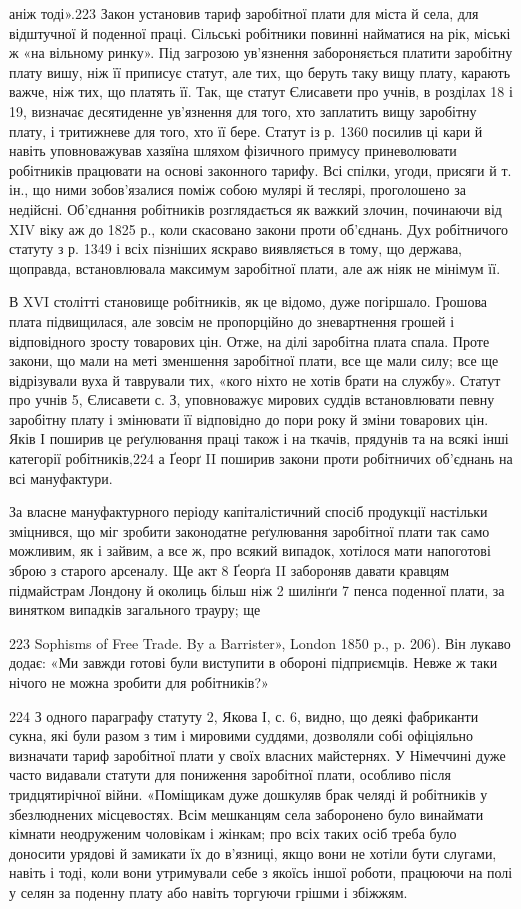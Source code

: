 аніж тоді».223 Закон установив тариф заробітної плати для міста
й села, для відштучної й поденної праці. Сільські робітники
повинні найматися на рік, міські ж «на вільному ринку». Під
загрозою ув’язнення забороняється платити заробітну плату
вишу, ніж її приписує статут, але тих, що беруть таку вищу
плату, карають важче, ніж тих, що платять її. Так, ще статут
Єлисавети про учнів, в розділах 18 і 19, визначає десятиденне
ув’язнення для того, хто заплатить вищу заробітну плату, і
тритижневе для того, хто її бере. Статут із р. 1360 посилив ці
кари й навіть уповноважував хазяїна шляхом фізичного примусу
приневолювати робітників працювати на основі законного тарифу.
Всі спілки, угоди, присяги й т. ін., що ними зобов’язалися поміж
собою мулярі й теслярі, проголошено за недійсні. Об’єднання
робітників розглядається як важкий злочин, починаючи від
XIV віку аж до 1825 р., коли скасовано закони проти об’єднань.
Дух робітничого статуту з р. 1349 і всіх пізніших яскраво виявляється
в тому, що держава, щоправда, встановлювала максимум
заробітної плати, але аж ніяк не мінімум її.

В XVI столітті становище робітників, як це відомо, дуже
погіршало. Грошова плата підвищилася, але зовсім не пропорційно
до зневартнення грошей і відповідного зросту товарових цін.
Отже, на ділі заробітна плата спала. Проте закони, що мали на
меті зменшення заробітної плати, все ще мали силу; все ще відрізували
вуха й таврували тих, «кого ніхто не хотів брати на
службу». Статут про учнів 5, Єлисавети с. З, уповноважує мирових
суддів встановлювати певну заробітну плату і змінювати
її відповідно до пори року й зміни товарових цін. Яків І поширив
це реґулювання праці також і на ткачів, прядунів та на всякі
інші категорії робітників,224 а Ґеорґ II поширив закони проти
робітничих об’єднань на всі мануфактури.

За власне мануфактурного періоду капіталістичний спосіб
продукції настільки зміцнився, що міг зробити законодатне
реґулювання заробітної плати так само можливим, як і зайвим,
а все ж, про всякий випадок, хотілося мати напоготові зброю
з старого арсеналу. Ще акт 8 Ґеорґа II забороняв давати кравцям
підмайстрам Лондону й околиць більш ніж 2 шилінґи 7 пенса
поденної плати, за винятком випадків загального трауру; ще

223 Sophisms of Free Trade. By a Barrister», London 1850 p., p. 206).
Він лукаво додає: «Ми завжди готові були виступити в обороні підприємців.
Невже ж таки нічого не можна зробити для робітників?»

224 З одного параграфу статуту 2, Якова І, с. 6, видно, що деякі
фабриканти сукна, які були разом з тим і мировими суддями, дозволяли
собі офіціяльно визначати тариф заробітної плати у своїх власних майстернях.
У Німеччині дуже часто видавали статути для пониження
заробітної плати, особливо після тридцятирічної війни. «Поміщикам
дуже дошкуляв брак челяді й робітників у збезлюднених місцевостях.
Всім мешканцям села заборонено було винаймати кімнати неодруженим
чоловікам і жінкам; про всіх таких осіб треба було доносити урядові
й замикати їх до в’язниці, якщо вони не хотіли бути слугами, навіть
і тоді, коли вони утримували себе з якоїсь іншої роботи, працюючи на
полі у селян за поденну плату або навіть торгуючи грішми і збіжжям.
